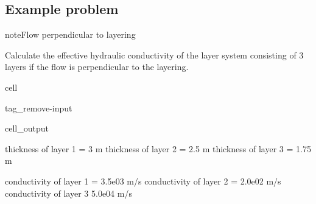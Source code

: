 \documentclass[letterpaper,10pt,english]{jupyterBook}
\begin{document}
\subsection{Example problem}
\label{\detokenize{content/flow/L5/15_het_iso:id1}}
\begin{sphinxadmonition}{note}{Flow perpendicular to layering}

\sphinxAtStartPar
Calculate the effective hydraulic conductivity of the layer system consisting of 3 layers if the flow is perpendicular to the layering.
\end{sphinxadmonition}

\begin{sphinxuseclass}{cell}
\begin{sphinxuseclass}{tag_remove-input}\begin{sphinxVerbatimOutput}

\begin{sphinxuseclass}{cell_output}
\begin{sphinxVerbatim}[commandchars=\\\{\}]
thickness of layer 1 = 3 m
thickness of layer 2 = 2.5 m
thickness of layer 3 = 1.75 m

conductivity of layer 1 = 3.5e\PYGZhy{}03 m/s
conductivity of layer 2 = 2.0e\PYGZhy{}02 m/s
conductivity of layer 3 5.0e\PYGZhy{}04 m/s
\end{sphinxVerbatim}

\end{sphinxuseclass}\end{sphinxVerbatimOutput}

\end{sphinxuseclass}
\end{sphinxuseclass}
\end{document}

